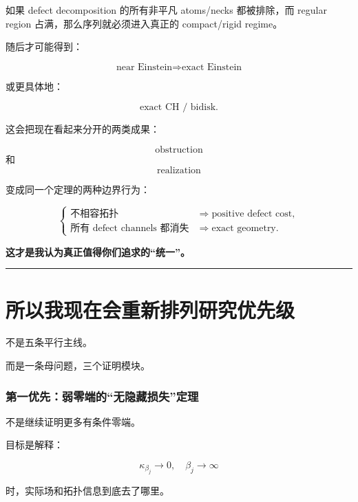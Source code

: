 \documentclass[
  10pt,
]{article}
\begin{document}
如果 defect decomposition 的所有非平凡 atoms/necks 都被排除，而 regular
region 占满，那么序列就必须进入真正的 compact/rigid regime。

随后才可能得到：

\[
\text{near Einstein}
\Longrightarrow
\text{exact Einstein}
\]

或更具体地：

\[
\text{exact CH / bidisk}.
\]

这会把现在看起来分开的两类成果：

\[
\text{obstruction}
\] 和 \[
\text{realization}
\]

变成同一个定理的两种边界行为：

\[
\boxed{
\begin{cases}
\text{不相容拓扑} &\Rightarrow \text{positive defect cost},\\[2mm]
\text{所有 defect channels 都消失} &\Rightarrow \text{exact geometry}.
\end{cases}
}
\]

\textbf{这才是我认为真正值得你们追求的``统一''。}

\begin{center}\rule{0.5\linewidth}{0.5pt}\end{center}

\hypertarget{ux6240ux4ee5ux6211ux73b0ux5728ux4f1aux91cdux65b0ux6392ux5217ux7814ux7a76ux4f18ux5148ux7ea7}{%
\section{所以我现在会重新排列研究优先级}\label{ux6240ux4ee5ux6211ux73b0ux5728ux4f1aux91cdux65b0ux6392ux5217ux7814ux7a76ux4f18ux5148ux7ea7}}

不是五条平行主线。

而是一条母问题，三个证明模块。

\hypertarget{ux7b2cux4e00ux4f18ux5148ux5f31ux96f6ux7aefux7684ux65e0ux9690ux85cfux635fux5931ux5b9aux7406}{%
\subsubsection{第一优先：弱零端的``无隐藏损失''定理}\label{ux7b2cux4e00ux4f18ux5148ux5f31ux96f6ux7aefux7684ux65e0ux9690ux85cfux635fux5931ux5b9aux7406}}

不是继续证明更多有条件零端。

目标是解释：

\[
\kappa_{\beta_j}\to0,\quad \beta_j\to\infty
\]

时，实际场和拓扑信息到底去了哪里。
\end{document}
